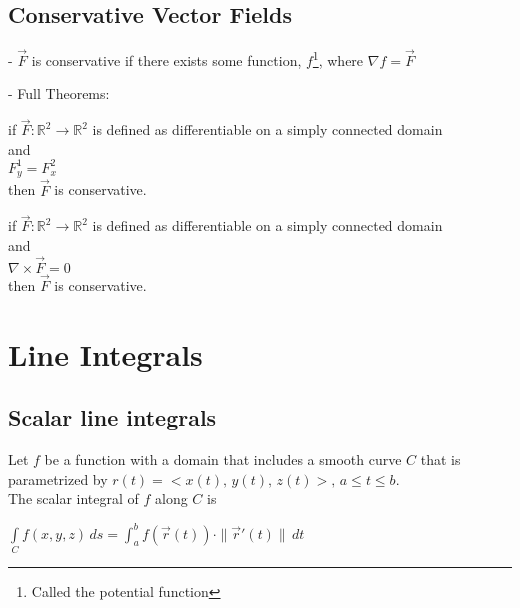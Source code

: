 \documentclass[12pt, letterpaper]{article}
\begin{document}
  \subsection*{Conservative Vector Fields}
  
  - \(\vec{F}\) is conservative if there exists some function, $f$\footnote{Called the potential function}, where $\nabla f = \vec{F}$ \newline

  \noindent - Full Theorems: 

  \begin{center}
    if \(\vec{F} : \mathbb{R}^{2} \rightarrow \mathbb{R}^{2}\) is defined as differentiable on a simply connected domain \\
    and \\
    \(F_{y}^{1} = F_{x}^{2}\) \\
    then \(\vec{F}\) is conservative.
  \end{center}

  \begin{center} 
    if \(\vec{F} : \mathbb{R}^{2} \rightarrow \mathbb{R}^{2}\) is defined as differentiable on a simply connected domain \\
    and \\ 
    \(\nabla \times \vec{F} = 0\) \\
    then \(\vec{F}\) is conservative.
  \end{center}

\pagebreak

  \section*{Line Integrals}

  \subsection*{Scalar line integrals}
  Let \(f\) be a function with a domain that includes a smooth curve \(C\) that is parametrized by \(r(t) = <x(t),\, y(t),\, z(t)>,\, a \leq t \leq b\).\\ 

  The scalar integral of \(f\) along \(C\) is 
  \begin{center}
    \(\int \limits_{C} f(x,y,z)\,ds = \int_{a}^{b}f(\vec{r}(t)) \cdot \|\vec{r}'(t)\|\,dt\)
  \end{center}
\end{document}
